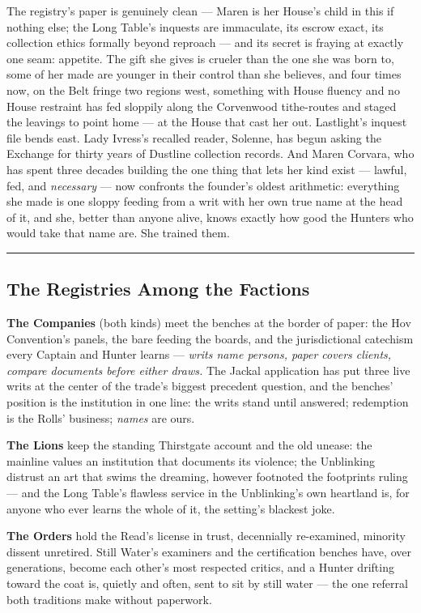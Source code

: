 The registry's paper is genuinely clean --- Maren is her House's child in this if nothing else; the Long Table's inquests are immaculate, its escrow exact, its collection ethics formally beyond reproach --- and its secret is fraying at exactly one seam: appetite. The gift she gives is crueler than the one she was born to, some of her made are younger in their control than she believes, and four times now, on the Belt fringe two regions west, something with House fluency and no House restraint has fed sloppily along the Corvenwood tithe-routes and staged the leavings to point home --- at the House that cast her out. Lastlight's inquest file bends east. Lady Ivress's recalled reader, Solenne, has begun asking the Exchange for thirty years of Dustline collection records. And Maren Corvara, who has spent three decades building the one thing that lets her kind exist --- lawful, fed, and \textit{necessary} --- now confronts the founder's oldest arithmetic: everything she made is one sloppy feeding from a writ with her own true name at the head of it, and she, better than anyone alive, knows exactly how good the Hunters who would take that name are. She trained them.

\medskip\hrule\medskip

\subsection{The Registries Among the Factions}

\textbf{The Companies} (both kinds) meet the benches at the border of paper: the Hov Convention's panels, the bare feeding the boards, and the jurisdictional catechism every Captain and Hunter learns --- \textit{writs name persons, paper covers clients, compare documents before either draws.} The Jackal application has put three live writs at the center of the trade's biggest precedent question, and the benches' position is the institution in one line: the writs stand until answered; redemption is the Rolls' business; \textit{names} are ours.

\textbf{The Lions} keep the standing Thirstgate account and the old unease: the mainline values an institution that documents its violence; the Unblinking distrust an art that swims the dreaming, however footnoted the footprints ruling --- and the Long Table's flawless service in the Unblinking's own heartland is, for anyone who ever learns the whole of it, the setting's blackest joke.

\textbf{The Orders} hold the Read's license in trust, decennially re-examined, minority dissent unretired. Still Water's examiners and the certification benches have, over generations, become each other's most respected critics, and a Hunter drifting toward the coat is, quietly and often, sent to sit by still water --- the one referral both traditions make without paperwork.

